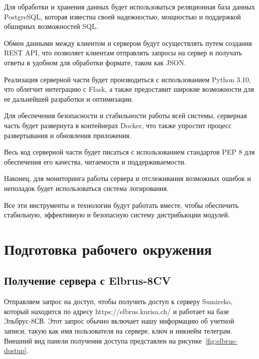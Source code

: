 Для обработки и хранения данных будет использоваться реляционная база данных PostgreSQL, которая известна своей надежностью, мощностью и поддержкой обширных возможностей SQL. 

Обмен данными между клиентом и сервером будут осуществлять путем создания REST API, что позволяет клиентам отправлять запросы на сервер и получать ответы в удобном для обработки формате, таком как JSON.

Реализация серверной части будет производиться с использованием Python 3.10, что облегчит интеграцию с Flask, а также предоставит широкие возможности для ее дальнейшей разработки и оптимизации.

Для обеспечения безопасности и стабильности работы всей системы, серверная часть будет развернута в контейнерах Docker, что также упростит процесс развертывания и обновления приложения.

Весь код серверной части будет писаться с использованием стандартов PEP 8 \cite{dev:pep} для обеспечения его качества, читаемости и поддерживаемости. 


Наконец, для мониторинга работы сервера и отслеживания возможных ошибок и неполадок будет использоваться система логирования. 

Все эти инструменты и технологии будут работать вместе, чтобы обеспечить стабильную, эффективную и безопасную систему дистрибьюции модулей.

\section{Подготовка рабочего окружения}

\subsection{Получение сервера с Elbrus-8CV}

Отправляем запрос на доступ, чтобы получить доступ к серверу Sumireko, который находится по адресу https://elbrus.kurisa.ch/ и работает на базе Эльбрус-8СВ. Этот запрос обычно включает нашу информацию об учетной записи, такую как имя пользователя на сервере, ключ и никнейм телеграм. Внешний вид панели получения доступа представлен на рисунке~\ref{fig:elbrus-dostup}.

